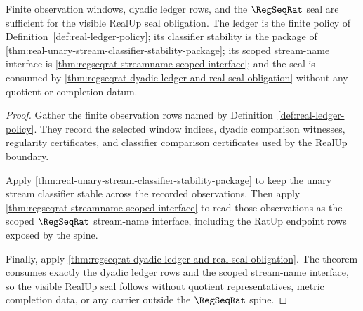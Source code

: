 \begin{theorem}
\label{thm:real-stream-prefix-ledger-seal-obligation}
Finite observation windows, dyadic ledger rows, and the $\RegSeqRat$ seal are
sufficient for the visible RealUp seal obligation. The ledger is the finite
policy of Definition~\ref{def:real-ledger-policy}; its classifier stability is
the package of
\autoref{thm:real-unary-stream-classifier-stability-package}; its scoped
stream-name interface is
\autoref{thm:regseqrat-streamname-scoped-interface}; and the seal is consumed
by \autoref{thm:regseqrat-dyadic-ledger-and-real-seal-obligation} without any
quotient or completion datum.
\end{theorem}
\begin{proof}
Gather the finite observation rows named by
Definition~\ref{def:real-ledger-policy}. They record the selected window
indices, dyadic comparison witnesses, regularity certificates, and classifier
comparison certificates used by the RealUp boundary.

Apply \autoref{thm:real-unary-stream-classifier-stability-package} to keep the
unary stream classifier stable across the recorded observations. Then apply
\autoref{thm:regseqrat-streamname-scoped-interface} to read those observations
as the scoped $\RegSeqRat$ stream-name interface, including the RatUp endpoint
rows exposed by the spine.

Finally, apply
\autoref{thm:regseqrat-dyadic-ledger-and-real-seal-obligation}. The theorem
consumes exactly the dyadic ledger rows and the scoped stream-name interface,
so the visible RealUp seal follows without quotient representatives, metric
completion data, or any carrier outside the $\RegSeqRat$ spine.
\end{proof}

